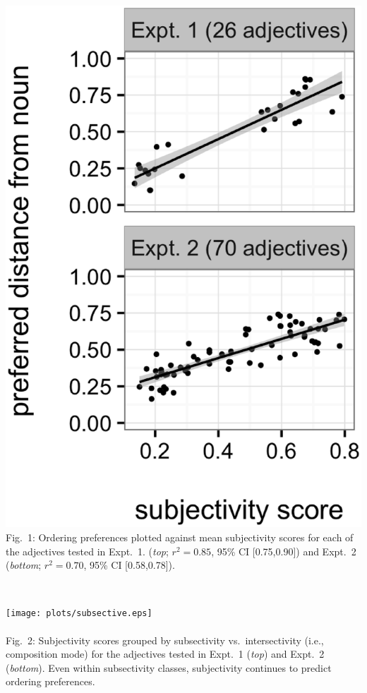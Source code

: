\documentclass[10pt]{article}
\begin{document}
\noindent\begin{minipage}[b]{.3\textwidth}
		\includegraphics[width=.95\linewidth]{plots/expts1-2.eps}
		Fig.~1: Ordering preferences plotted against mean subjectivity scores for each of the adjectives tested in Expt.~1. (\emph{top}; $r^2=0.85$, 95\% CI [0.75,0.90]) and Expt.~2 (\emph{bottom}; $r^2=0.70$, 95\% CI [0.58,0.78]).
\end{minipage}\hfil\ \ 
\begin{minipage}[b]{.3\textwidth}
	\texttt{[image: plots/subsective.eps]}\\
	\vspace{-20pt}\\
	Fig.~2: Subjectivity scores grouped by subsectivity vs.~intersectivity (i.e., composition mode) for the adjectives tested in Expt.~1 (\emph{top}) and  Expt.~2 (\emph{bottom}). Even within subsectivity classes, subjectivity continues to predict ordering preferences.
\end{minipage}\hfil\ \   
\end{document}
